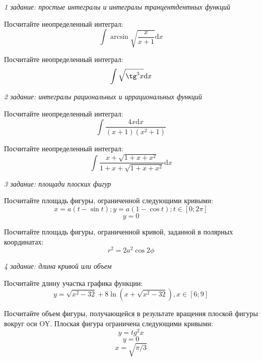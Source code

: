 \documentclass[russian]{article}
\newcommand{\dx}{\text{d}x}
\begin{document}
\textit{1 задание: простые интегралы и интегралы транцентдентных функций}

Посчитайте неопределенный интеграл:
$$\int \arcsin\sqrt{\frac{x}{x + 1}} \dx$$

Посчитайте неопределенный интеграл:
$$\int \sqrt{\tg^3 x} \dx$$

\textit{2 задание: интегралы рациональных и иррациональных функций}

Посчитайте неопределенный интеграл:
$$\int \frac{4x\dx}{(x + 1)(x^2 + 1)}$$

Посчитайте неопределенный интеграл:
$$\int \frac{x + \sqrt{1 + x + x^2}}{1 + x + \sqrt{1 + x + x^2}} \dx$$

\textit{3 задание: площади плоских фигур}

Посчитайте площадь фигуры, ограниченной следующими кривыми:
$$x = a(t - \sin t); y = a(1 - \cos t); t \in [0; 2\pi]$$
$$y = 0$$

Посчитайте площадь фигуры, ограниченной кривой, заданной в полярных координатах:
$$ r^2 = 2a^2 \cos 2 \phi$$

\textit{4 задание: длина кривой или объем}

Посчитайте длину участка графика функции:
$$ y = \sqrt{x^2 - 32} + 8 \ln (x + \sqrt{x^2 - 32}), x \in [6;9]$$

Посчитайте объем фигуры, получающейся в результате вращения плоской фигуры вокруг оси OY. Плоская фигура ограничена следующими кривыми:
$$y = tg^2 x$$
$$y = 0$$
$$x = \sqrt{\pi/3}$$
\end{document}
